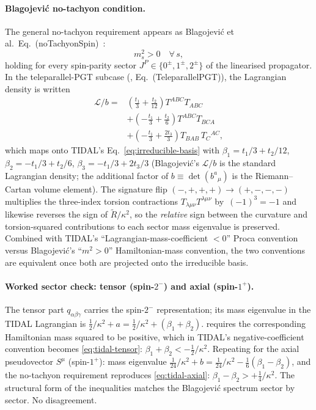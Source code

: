 \paragraph{Blagojevi\'c no-tachyon condition.}
The general no-tachyon requirement appears as Blagojevi\'c et al.\
Eq.~(noTachyonSpin)~\cite[line~846]{blagojevic2018ghost}:
\begin{equation}
  m_s^2 > 0 \quad \forall \, s,
  \label{eq:blagojevic-no-tachyon}
\end{equation}
holding for every spin-parity sector $J^P \in \{0^\pm, 1^\pm, 2^\pm\}$ of the
linearised propagator.  In the teleparallel-PGT subcase
(\cite[lines~1146--1158]{blagojevic2018ghost}, Eq.~(TeleparallelPGT)),
the Lagrangian density is written
\begin{align*}
  \mathcal{L}/b
  =& \left(\tfrac{t_1}{3}+\tfrac{t_2}{12}\right) T^{ABC} T_{ABC} \\
  &+ \left(-\tfrac{t_1}{3}+\tfrac{t_2}{6}\right) T^{ABC} T_{BCA} \\
  &+ \left(-\tfrac{t_1}{3}+\tfrac{2t_3}{3}\right) T_{BAB}\, T_C{}^{AC},
\end{align*}
which maps onto TIDAL's Eq.~\ref{eq:irreducible-basis} with
$\beta_1 = t_1/3 + t_2/12$, $\beta_2 = -t_1/3 + t_2/6$,
$\beta_3 = -t_1/3 + 2t_3/3$ (Blagojevi\'c's $\mathcal{L}/b$ is the standard
Lagrangian density; the additional factor of $b\equiv\det(b^a{}_\mu)$ is the
Riemann--Cartan volume element).  The signature flip $(-,+,+,+) \to (+,-,-,-)$
multiplies the three-index torsion contractions $T_{\lambda\mu\nu} T^{\lambda\mu\nu}$
by~$(-1)^3 = -1$ and likewise reverses the sign of $\tilde{R}/\kappa^2$, so the
\emph{relative} sign between the curvature and torsion-squared contributions to
each sector mass eigenvalue is preserved.  Combined with TIDAL's
``Lagrangian-mass-coefficient $<0$'' Proca convention versus Blagojevi\'c's
``$m^2 > 0$'' Hamiltonian-mass convention, the two conventions are equivalent
once both are projected onto the irreducible basis.

\paragraph{Worked sector check: tensor (spin-$2^-$) and axial (spin-$1^+$).}
The tensor part $q_{\alpha\beta\gamma}$ carries the spin-$2^-$ representation;
its mass eigenvalue in the TIDAL Lagrangian is
$\tfrac{1}{2}/\kappa^2 + a = \tfrac{1}{2}/\kappa^2 + (\beta_1+\beta_2)$.
\Cref{eq:blagojevic-no-tachyon} requires the corresponding Hamiltonian mass
squared to be positive, which in TIDAL's negative-coefficient convention
becomes \cref{eq:tidal-tensor}:
$\beta_1 + \beta_2 < -\tfrac{1}{2}/\kappa^2$.
Repeating for the axial pseudovector $S^\mu$ (spin-$1^+$): mass eigenvalue
$\tfrac{1}{24}/\kappa^2 + b = \tfrac{1}{24}/\kappa^2 - \tfrac{1}{6}(\beta_1-\beta_2)$,
and the no-tachyon requirement reproduces \cref{eq:tidal-axial}:
$\beta_1 - \beta_2 > +\tfrac{1}{4}/\kappa^2$.
The structural form of the inequalities matches the Blagojevi\'c spectrum
sector by sector.  No disagreement.

